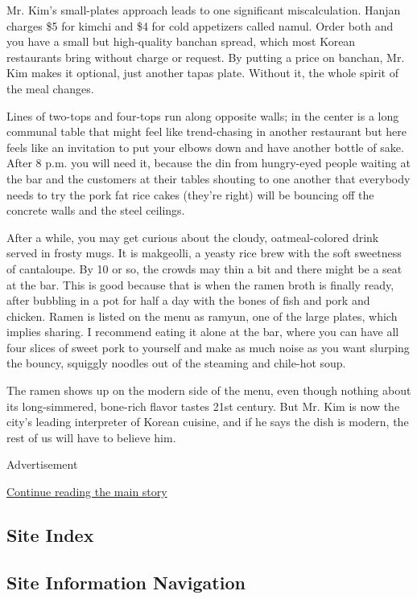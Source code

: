 Mr. Kim's small-plates approach leads to one significant miscalculation.
Hanjan charges \$5 for kimchi and \$4 for cold appetizers called namul.
Order both and you have a small but high-quality banchan spread, which
most Korean restaurants bring without charge or request. By putting a
price on banchan, Mr. Kim makes it optional, just another tapas plate.
Without it, the whole spirit of the meal changes.

Lines of two-tops and four-tops run along opposite walls; in the center
is a long communal table that might feel like trend-chasing in another
restaurant but here feels like an invitation to put your elbows down and
have another bottle of sake. After 8 p.m. you will need it, because the
din from hungry-eyed people waiting at the bar and the customers at
their tables shouting to one another that everybody needs to try the
pork fat rice cakes (they're right) will be bouncing off the concrete
walls and the steel ceilings.

After a while, you may get curious about the cloudy, oatmeal-colored
drink served in frosty mugs. It is makgeolli, a yeasty rice brew with
the soft sweetness of cantaloupe. By 10 or so, the crowds may thin a bit
and there might be a seat at the bar. This is good because that is when
the ramen broth is finally ready, after bubbling in a pot for half a day
with the bones of fish and pork and chicken. Ramen is listed on the menu
as ramyun, one of the large plates, which implies sharing. I recommend
eating it alone at the bar, where you can have all four slices of sweet
pork to yourself and make as much noise as you want slurping the bouncy,
squiggly noodles out of the steaming and chile-hot soup.

The ramen shows up on the modern side of the menu, even though nothing
about its long-simmered, bone-rich flavor tastes 21st century. But Mr.
Kim is now the city's leading interpreter of Korean cuisine, and if he
says the dish is modern, the rest of us will have to believe him.

Advertisement

\protect\hyperlink{after-bottom}{Continue reading the main story}

\hypertarget{site-index}{%
\subsection{Site Index}\label{site-index}}

\hypertarget{site-information-navigation}{%
\subsection{Site Information
Navigation}\label{site-information-navigation}}

